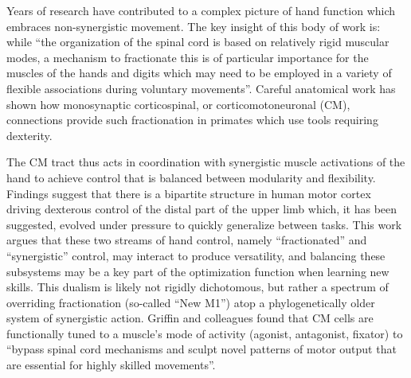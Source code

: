\documentclass[../main.tex]{subfiles}
\begin{document}
Years of research have contributed to a complex picture of hand function which embraces non-synergistic movement. The key insight of this body of work is: while ``the organization of the spinal cord is based on relatively rigid muscular modes, a mechanism to fractionate this is of particular importance for the muscles of the hands and digits which may need to be employed in a variety of flexible associations during voluntary movements''\cite{lemonCorticalControlPrimate1993,lemonMechanismsCorticalControl1997,lemonDescendingPathwaysMotor2008}. Careful anatomical work has shown how monosynaptic corticospinal, or corticomotoneuronal (CM), connections provide such fractionation in primates which use tools requiring dexterity.

The CM tract thus acts in coordination with synergistic muscle activations of the hand to achieve control that is balanced between modularity and flexibility. Findings suggest that there is a bipartite structure in human motor cortex driving dexterous control of the distal part of the upper limb which, it has been suggested, evolved under pressure to quickly generalize between tasks. This work argues that these two streams of hand control, namely ``fractionated'' and ``synergistic'' control, may interact to produce versatility, and balancing these subsystems may be a key part of the optimization function when learning new skills\cite{Rathelot2009,griffinCorticomotoneuronalCellsAre2015,Takei2017}. This dualism is likely not rigidly dichotomous, but rather a spectrum of overriding fractionation (so-called ``New M1'') atop a phylogenetically older system of synergistic action\cite{dumCorticospinalSystemStructural2011}. Griffin and colleagues found that CM cells are functionally tuned to a muscle's mode of activity (agonist, antagonist, fixator) to ``bypass spinal cord mechanisms and sculpt novel patterns of motor output that are essential for highly skilled movements''\cite{griffinCorticomotoneuronalCellsAre2015}. 
\end{document}
